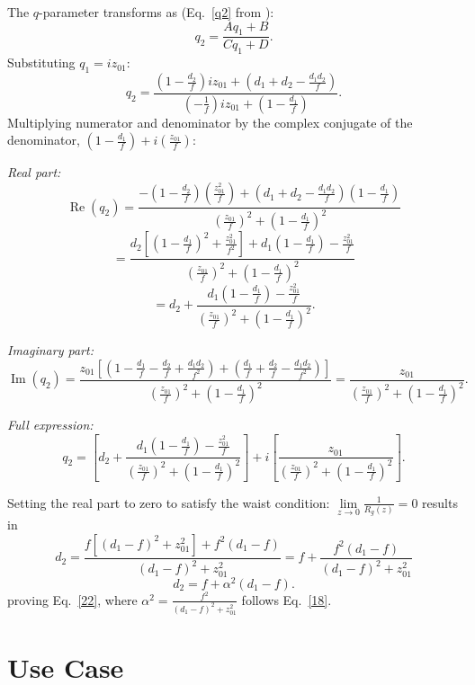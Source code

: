 \documentclass[11pt, letterpaper]{article}
\begin{document}
\begin{enumerate}
The $q$-parameter transforms as (Eq.~\eqref{q2} from \cite{Osche}):
\begin{equation}\label{q2}
q_2 = \frac{A q_1 + B}{C q_1 + D}.
\end{equation}
Substituting $q_1=iz_{01}$:
$$q_2=\frac{\left(1 - \frac{d_2}{f}\right)iz_{01} + \left(d_1 + d_2 - \frac{d_1 d_2}{f}\right)}{\left(-\frac{1}{f}\right)iz_{01} + \left(1 - \frac{d_1}{f}\right)}.$$
Multiplying numerator and denominator by the complex conjugate of the denominator,
$\left(1 - \frac{d_1}{f}\right)+i\left(\frac{z_{01}}{f}\right)$:

\medskip
\emph{Real part:}
$$\operatorname{Re}(q_2)=\frac{-\left(1-\frac{d_2}{f}\right)\left(\frac{z_{01}^2}{f}\right)+\left(d_1+d_2-\frac{d_1d_2}{f}\right)\left(1-\frac{d_1}{f}\right)}{\left(\frac{z_{01}}{f}\right)^2+\left(1-\frac{d_1}{f}\right)^2}$$
$$=\frac{d_2\left[\left(1 - \frac{d_1}{f}\right)^2 + \frac{z_{01}^2}{f^2}\right] + d_1\left(1 - \frac{d_1}{f}\right) - \frac{z_{01}^2}{f}}{\left(\frac{z_{01}}{f}\right)^2+\left(1-\frac{d_1}{f}\right)^2}$$
$$= d_2 + \frac{d_1\left(1 - \frac{d_1}{f}\right) - \frac{z_{01}^2}{f}}{\left(\frac{z_{01}}{f}\right)^2+\left(1-\frac{d_1}{f}\right)^2}.$$

\medskip
\emph{Imaginary part:}
$$\operatorname{Im}(q_2)=\frac{z_{01}\left[\left(1-\frac{d_1}{f}-\frac{d_2}{f}+\frac{d_1d_2}{f^2}\right)+\left(\frac{d_1}{f}+\frac{d_2}{f}-\frac{d_1d_2}{f^2}\right)\right]}{\left(\frac{z_{01}}{f}\right)^2+\left(1-\frac{d_1}{f}\right)^2}
=\frac{z_{01}}{\left(\frac{z_{01}}{f}\right)^2+\left(1-\frac{d_1}{f}\right)^2}.$$

\medskip
\emph{Full expression:}
$$q_2=\left[d_2 + \frac{d_1\!\left(1 - \frac{d_1}{f}\right) - \frac{z_{01}^2}{f}}{\left(\frac{z_{01}}{f}\right)^2+\left(1-\frac{d_1}{f}\right)^2}\right]+i\left[\frac{z_{01}}{\left(\frac{z_{01}}{f}\right)^2+\left(1-\frac{d_1}{f}\right)^2}\right].$$

Setting the real part to zero to satisfy the waist condition: $\lim\limits_{z\to 0}\frac{1}{R_g(z)}=0$ results in
$$d_2 = \frac{f\!\left[(d_1-f)^2 + z_{01}^2\right] + f^2(d_1-f)}{(d_1-f)^2+z_{01}^2}
= f + \frac{f^2(d_1-f)}{(d_1-f)^2+z_{01}^2}$$
$$d_2 = f + \alpha^2(d_1 - f).$$
proving Eq.~\eqref{22}, where $\alpha^2 = \frac{f^2}{(d_1-f)^2+z_{01}^2}$ follows Eq.~\eqref{18}.
\end{enumerate}

\section{Use Case}
\end{document}
